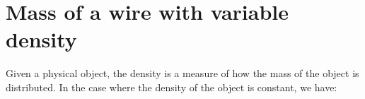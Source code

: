 \documentclass{ximera}
\begin{document}
%
%
%
%
%

\section{Mass of a wire with variable density}

Given a physical object, the density is a measure of how the mass of the object is distributed.  In the case where the density of the object is constant, we have:
\end{document}
